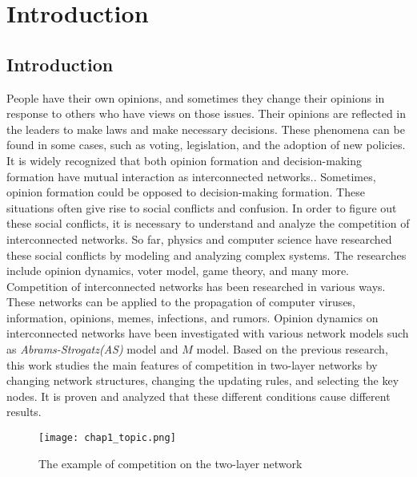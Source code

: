 
\chapter{Introduction}
\label{chap1}
\section{Introduction}
People have their own opinions, and sometimes they change their opinions in response to others who have views on those issues. Their opinions are reflected in the leaders to make laws and make necessary decisions. These phenomena can be found in some cases, such as voting, legislation, and the adoption of new policies. It is widely recognized that both opinion formation and decision-making formation have mutual interaction as interconnected networks.\parencite{mikko2014, danziger2019, newman2010, boccaletti2014, domenico2013, tomasini2015, namkhanhvu2017}. Sometimes, opinion formation could be opposed to decision-making formation. These situations often give rise to social conflicts and confusion. In order to figure out these social conflicts, it is necessary to understand and analyze the competition of interconnected networks. So far, physics and computer science have researched these social conflicts by modeling and analyzing complex systems\parencite{fangwu2004, zuev2012, laguna2004, masuda2014}. The researches include opinion dynamics, voter model, game theory, and many more.\parencite{smyrnakis2019, bianconi2018, redner2017, haibo2017, amato2017, quattrociocchi2014, casey2009} 
Competition of interconnected networks has been researched in various ways. These networks can be applied to the propagation of computer viruses, information, opinions, memes, infections, and rumors\parencite{hua2014,shenyu2018, zhou2018,alvarez2016,gomez2015,diep2017,rocca2014,velasquez2018}. Opinion dynamics on interconnected networks have been investigated with various network models such as \textit{Abrams-Strogatz(AS)} model\parencite{abrams2003,vazquez2010} and $M$ model\parencite{rocca2014}.  Based on the previous research, this work studies the main features of competition in two-layer networks by changing network structures, changing the updating rules, and selecting the key nodes. It is proven and analyzed that these different conditions cause different results.
\begin{figure}[!htb]
	\centering
	\texttt{[image: chap1\_topic.png]}
	\caption{The example of competition on the two-layer network}
	\label{chap1_topic}
\end{figure}

